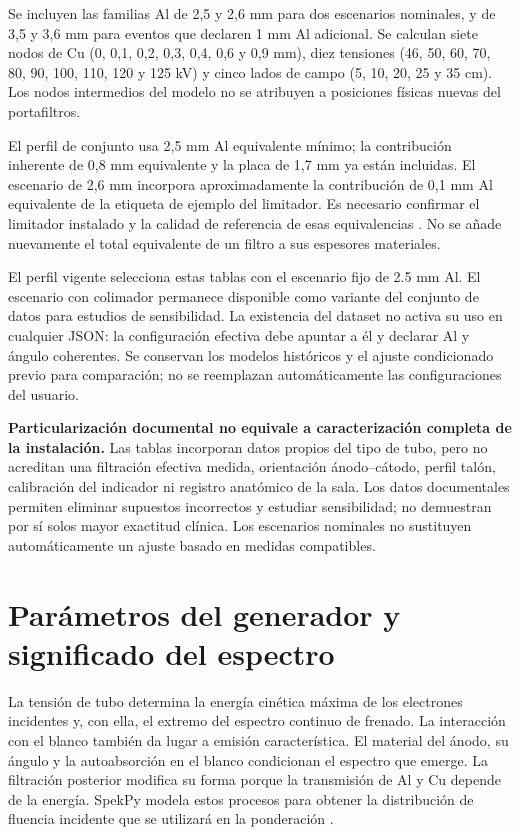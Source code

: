 Se incluyen las familias Al de 2,5 y 2,6 mm para dos escenarios nominales, y de 3,5 y 3,6 mm para eventos que declaren 1 mm Al adicional. Se calculan siete nodos de Cu (0, 0,1, 0,2, 0,3, 0,4, 0,6 y 0,9 mm), diez tensiones (46, 50, 60, 70, 80, 90, 100, 110, 120 y 125 kV) y cinco lados de campo (5, 10, 20, 25 y 35 cm). Los nodos intermedios del modelo no se atribuyen a posiciones físicas nuevas del portafiltros.

El perfil de conjunto usa 2,5 mm Al equivalente mínimo; la contribución inherente de 0,8 mm equivalente y la placa de 1,7 mm ya están incluidas. El escenario de 2,6 mm incorpora aproximadamente la contribución de 0,1 mm Al equivalente de la etiqueta de ejemplo del limitador. Es necesario confirmar el limitador instalado y la calidad de referencia de esas equivalencias \citep{mrcservice,azurion22}. No se añade nuevamente el total equivalente de un filtro a sus espesores materiales.

El perfil vigente  selecciona estas tablas con el escenario fijo de \num{2.5} mm Al. El escenario con colimador permanece disponible como variante del conjunto de datos para estudios de sensibilidad. La existencia del dataset no activa su uso en cualquier JSON: la configuración efectiva debe apuntar a él y declarar Al y ángulo coherentes. Se conservan los modelos históricos y el ajuste condicionado previo para comparación; no se reemplazan automáticamente las configuraciones del usuario.

\textbf{Particularización documental no equivale a caracterización completa de la instalación.} Las tablas incorporan datos propios del tipo de tubo, pero no acreditan una filtración efectiva medida, orientación ánodo--cátodo, perfil talón, calibración del indicador ni registro anatómico de la sala. Los datos documentales permiten eliminar supuestos incorrectos y estudiar sensibilidad; no demuestran por sí solos mayor exactitud clínica. Los escenarios nominales no sustituyen automáticamente un ajuste basado en medidas compatibles.

\section{Parámetros del generador y significado del espectro}
La tensión de tubo determina la energía cinética máxima de los electrones incidentes y, con ella, el extremo del espectro continuo de frenado. La interacción con el blanco también da lugar a emisión característica. El material del ánodo, su ángulo y la autoabsorción en el blanco condicionan el espectro que emerge. La filtración posterior modifica su forma porque la transmisión de Al y Cu depende de la energía. SpekPy modela estos procesos para obtener la distribución de fluencia incidente que se utilizará en la ponderación \citep{spek2020,spek2021}.

